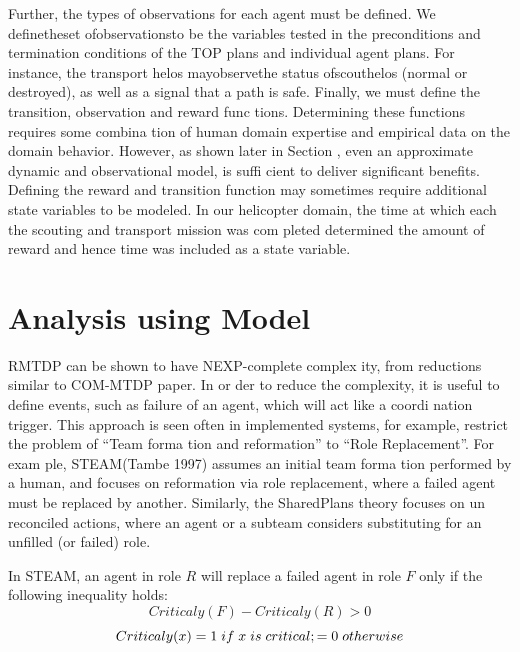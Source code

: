 \documentclass{IEEEtran}
\begin{document}
 Further, the types of observations for each agent must be
 defined. We definetheset ofobservationsto be the variables
 tested in the preconditions and termination conditions of the
 TOP plans and individual agent plans. For instance, the
 transport helos mayobservethe status ofscouthelos (normal
 or destroyed), as well as a signal that a path is safe. Finally,
 we must define the transition, observation and reward func
tions. Determining these functions requires some combina
tion of human domain expertise and empirical data on the
 domain behavior. However, as shown later in Section , even an approximate dynamic and observational model, is suffi
cient to deliver significant benefits. Defining the reward and
 transition function may sometimes require additional state
 variables to be modeled. In our helicopter domain, the time
 at which each the scouting and transport mission was com
pleted determined the amount of reward and hence time was
 included as a state variable.

\section{\textbf{Analysis using Model}}
 RMTDP can be shown to have NEXP-complete complex
ity, from reductions similar to COM-MTDP paper. In or
der to reduce the complexity, it is useful to define events,
 such as failure of an agent, which will act like a coordi
nation trigger. This approach is seen often in implemented
 systems, for example, restrict the problem of “Team forma
tion and reformation” to “Role Replacement”. For exam
ple, STEAM(Tambe 1997) assumes an initial team forma
tion performed by a human, and focuses on reformation via
 role replacement, where a failed agent must be replaced by
 another. Similarly, the SharedPlans theory focuses on un
reconciled actions\cite{Grosz}, where an agent or
 a subteam considers substituting for an unfilled (or failed)
 role.

 In STEAM, an agent in role $R$ will replace a failed agent
 in role $F$ only if the following inequality holds:
\begin{equation}
Criticaly(F)-Criticaly(R)>0
\end{equation}
\begin{equation*}
Criticaly(x)=1\hspace{0.1cm} if\hspace{0.1cm} x \hspace{0.1cm} is\hspace{0.1cm} critical;=0 \hspace{0.1cm}otherwise 
\end{equation*}
\end{document}
